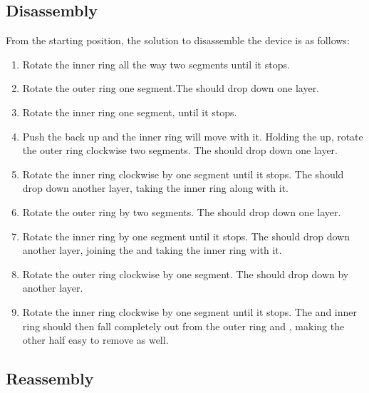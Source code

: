 \documentclass{article}
\begin{document}
\subsection{Disassembly}

From the starting position, the solution to disassemble the device is as follows:
\begin{enumerate}
      \item Rotate the inner ring all the way \cc{} two segments until it stops.
      \item Rotate the outer ring \cc{} one segment.The \hhalf{} should drop down one layer.
      \item Rotate the inner ring \cc{} one segment, until it stops.
      \item Push the \hhalf{} back up and the inner ring will move with it.
            Holding the \hhalf{} up, rotate the outer ring clockwise two segments.
            The \vhalf{} should drop down one layer.
      \item Rotate the inner ring clockwise by one segment until it stops.
            The \vhalf{} should drop down another layer, taking the inner ring along with it.
      \item Rotate the outer ring \cc{} by two segments.
            The \hhalf{} should drop down one layer.
      \item Rotate the inner ring \cc{} by one segment until it stops.
            The \hhalf{} should drop down another layer, joining the \vhalf{} and taking the inner ring with it.
      \item Rotate the outer ring clockwise by one segment.
            The \vhalf{} should drop down by another layer.
      \item Rotate the inner ring clockwise by one segment until it stops.
            The \vhalf{} and inner ring should then fall completely out from the outer ring and \hhalf{}, making the other half easy to remove as well.
\end{enumerate}

\subsection{Reassembly}
\end{document}
